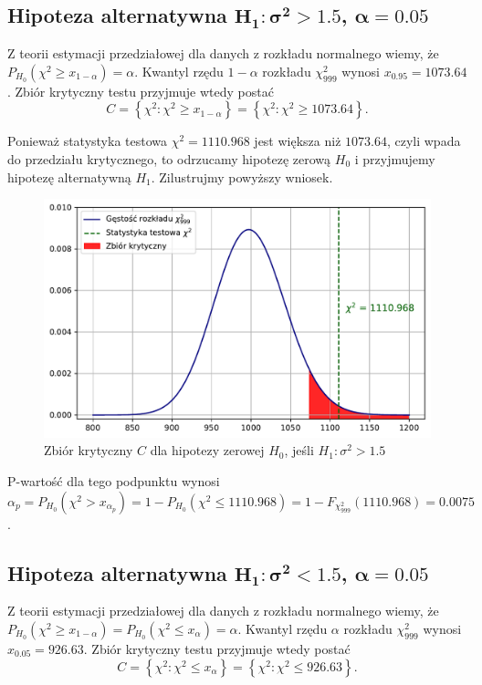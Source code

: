 \documentclass[12pt]{mwart}
\begin{document}
	\subsection{Hipoteza alternatywna $\bm{H_1 \colon \sigma^2 > 1.5}$, $\bm{\alpha=0.05}$}
	\noindent Z teorii estymacji przedziałowej dla danych z rozkładu normalnego wiemy, że $P_{H_0}(\chi^2 \geq x_{1-\alpha})=\alpha$. Kwantyl rzędu $1-\alpha$ rozkładu $\chi^2_{999}$ wynosi $x_{0.95}=1073.64$. Zbiór krytyczny testu przyjmuje wtedy postać 
	$$C = \left\lbrace \chi^2: \chi^2\geq x_{1-\alpha} \right\rbrace = \left\lbrace \chi^2: \chi^2 \geq 1073.64 \right\rbrace .$$ 
	
\noindent Ponieważ statystyka testowa $\chi^2=1110.968$ jest większa niż $1073.64$, czyli wpada do przedziału krytycznego, to odrzucamy hipotezę zerową $H_0$ i przyjmujemy hipotezę alternatywną $H_1$. Zilustrujmy powyższy wniosek.

	\begin{figure}[H]
	\begin{center}
		\includegraphics[scale=0.6]{krytyczny5.pdf}
		\caption{Zbiór krytyczny $C$ dla hipotezy zerowej $H_0$, jeśli $H_1 \colon \sigma^2 > 1.5$}
	\end{center}
	\end{figure}

\noindent P-wartość dla tego podpunktu wynosi $\alpha_p = P_{H_0}(\chi^2 > x_{\alpha_p}) = 1 - P_{H_0}(\chi^2 \leq 1110.968) = 1 - F_{\chi^2_{999}}(1110.968) = 0.0075$.



	\subsection{Hipoteza alternatywna $\bm{H_1 \colon \sigma^2 < 1.5}$, $\bm{\alpha=0.05}$}
	\noindent Z teorii estymacji przedziałowej dla danych z rozkładu normalnego wiemy, że $P_{H_0}(\chi^2 \geq x_{1-\alpha})=P_{H_0}(\chi^2 \leq x_{\alpha})=\alpha$. Kwantyl rzędu $\alpha$ rozkładu $\chi^2_{999}$ wynosi $x_{0.05}=926.63$. Zbiór krytyczny testu przyjmuje wtedy postać 
	$$C = \left\lbrace \chi^2: \chi^2 \leq x_{\alpha} \right\rbrace = \left\lbrace \chi^2: \chi^2 \leq 926.63 \right\rbrace .$$ 
	
\end{document}

